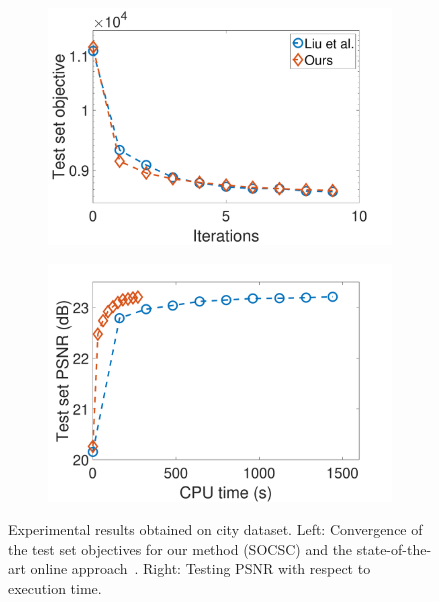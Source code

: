 \begin{figure}[h]
\centering
\begin{subfigure}{0.45\textwidth}
  \includegraphics[width=1\linewidth]{figure/onlineVSliu-ite.pdf}
\end{subfigure}
\begin{subfigure}{0.45\textwidth}
  \includegraphics[width=1\linewidth]{figure/onlineVSliu-time.pdf}
\end{subfigure}

\caption{Experimental results obtained on city dataset. Left: Convergence of the test set objectives for our method (SOCSC) and the state-of-the-art online approach~\cite{liu-2018-first}. Right: Testing PSNR with respect to execution time.}
\label{fig:onlineSmall-city}
\end{figure}

